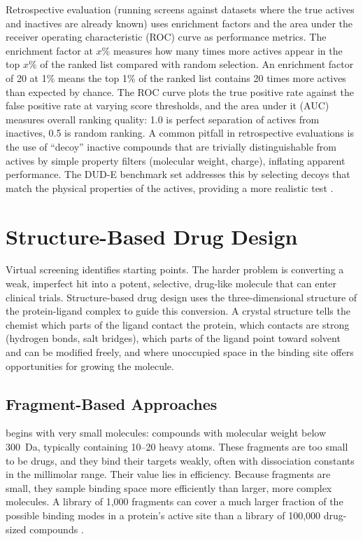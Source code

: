 Retrospective evaluation (running screens against datasets where the true actives and inactives are already known) uses enrichment factors and the area under the receiver operating characteristic (ROC) curve as performance metrics. The enrichment factor at $x$\% measures how many times more actives appear in the top $x$\% of the ranked list compared with random selection. An enrichment factor of 20 at 1\% means the top 1\% of the ranked list contains 20 times more actives than expected by chance. The ROC curve plots the true positive rate against the false positive rate at varying score thresholds, and the area under it (AUC) measures overall ranking quality: 1.0 is perfect separation of actives from inactives, 0.5 is random ranking. A common pitfall in retrospective evaluations is the use of ``decoy'' inactive compounds that are trivially distinguishable from actives by simple property filters (molecular weight, charge), inflating apparent performance. The DUD-E benchmark set addresses this by selecting decoys that match the physical properties of the actives, providing a more realistic test \cite{mysinger2012}.


\section{Structure-Based Drug Design}
\label{sec:sbdd}

Virtual screening identifies starting points. The harder problem is converting a weak, imperfect hit into a potent, selective, drug-like molecule that can enter clinical trials. Structure-based drug design uses the three-dimensional structure of the protein-ligand complex to guide this conversion. A crystal structure tells the chemist which parts of the ligand contact the protein, which contacts are strong (hydrogen bonds, salt bridges), which parts of the ligand point toward solvent and can be modified freely, and where unoccupied space in the binding site offers opportunities for growing the molecule.


\subsection{Fragment-Based Approaches}
\label{sec:fbdd}

 begins with very small molecules: compounds with molecular weight below 300~Da, typically containing 10--20 heavy atoms. These fragments are too small to be drugs, and they bind their targets weakly, often with dissociation constants in the millimolar range. Their value lies in efficiency. Because fragments are small, they sample binding space more efficiently than larger, more complex molecules. A library of 1,000 fragments can cover a much larger fraction of the possible binding modes in a protein's active site than a library of 100,000 drug-sized compounds \cite{erlanson2016}.

